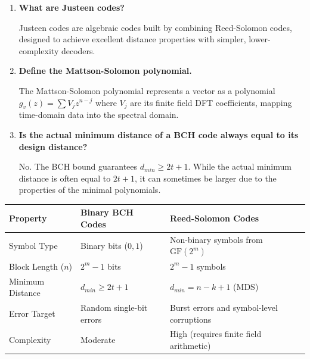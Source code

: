 \documentclass[12pt,a4paper]{article}
\newcommand{\Q}[1]{\textbf{#1}\par\noindent\ignorespaces}
\renewcommand{\arraystretch}{1.45}
\begin{document}
\begin{tcolorbox}[exambox, title={\textbf{Frequently Asked / Viva Questions}}]
\begin{enumerate}[topsep=0pt, label=\textbf{Q\arabic*.}, itemsep=5pt]
  \item \Q{What are Justeen codes?}
    Justeen codes are algebraic codes built by combining Reed-Solomon codes, designed to achieve excellent distance properties with simpler, lower-complexity decoders.
  \item \Q{Define the Mattson-Solomon polynomial.}
    The Mattson-Solomon polynomial represents a vector as a polynomial $g_v(z) = \sum V_j z^{n-j}$ where $V_j$ are its finite field DFT coefficients, mapping time-domain data into the spectral domain.
  \item \Q{Is the actual minimum distance of a BCH code always equal to its design distance?}
    No. The BCH bound guarantees $d_{min} \ge 2t+1$. While the actual minimum distance is often equal to $2t+1$, it can sometimes be larger due to the properties of the minimal polynomials.
\end{enumerate}
\end{tcolorbox}

\vspace{6pt}

\begin{tcolorbox}[tikzbox, title={\textbf{Comparison of BCH and Reed-Solomon Codes}}]
\renewcommand{\arraystretch}{1.45}
\begin{tabularx}{\linewidth}{|B{3.2cm}|Y|Y|}
\hline
\textbf{Property} & \textbf{Binary BCH Codes} & \textbf{Reed-Solomon Codes} \\
\hline
Symbol Type & Binary bits ($0, 1$) & Non-binary symbols from $\text{GF}(2^m)$ \\
\hline
Block Length ($n$) & $2^m - 1$ bits & $2^m - 1$ symbols \\
\hline
Minimum Distance & $d_{min} \ge 2t + 1$ & $d_{min} = n - k + 1$ (MDS) \\
\hline
Error Target & Random single-bit errors & Burst errors and symbol-level corruptions \\
\hline
Complexity & Moderate & High (requires finite field arithmetic) \\
\hline
\end{tabularx}
\end{tcolorbox}
\end{document}

